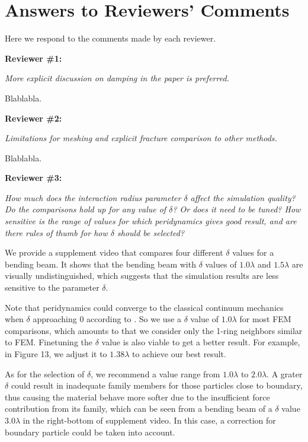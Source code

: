 \section{Answers to Reviewers' Comments}

Here we respond to the comments made by each reviewer.

\noindent{}\textbf{Reviewer \#1:}

\emph{More explicit discussion on damping in the paper is preferred.}

Blablabla.

\noindent{}\textbf{Reviewer \#2:}

\emph{Limitations for meshing and explicit fracture comparison to other methods.}

Blablabla.

\noindent{}\textbf{Reviewer \#3:}

\emph{How much does the interaction radius parameter $\delta$ affect the simulation quality? Do the comparisons hold up for any value of $\delta$? Or does it need to be tuned? How sensitive is the range of values for which peridynamics gives good result, and are there rules of thumb for how $\delta$ should be selected?}

We provide a supplement video that compares four different $\delta$ values for a bending beam. It shows that the bending beam with $\delta$ values of $1.0\lambda$ and $1.5\lambda$ are visually undistinguished, which suggests that the simulation results are less sensitive to the parameter $\delta$.

Note that peridynamics could converge to the classical continuum mechanics when $\delta$ approaching 0 according to \cite{Weckner2005705}. So we use a $\delta$ value of $1.0\lambda$ for most FEM comparisons, which amounts to that we consider only the 1-ring neighbors similar to FEM. Finetuning the $\delta$ value is also viable to get a better result. For example, in Figure 13, we adjust it to $1.38\lambda$ to achieve our best result.

As for the selection of $\delta$, we recommend a value range from $1.0\lambda$ to $2.0\lambda$.
A grater $\delta$ could result in inadequate family members for those particles close to boundary, thus causing the material behave more softer due to the insufficient force contribution from its family, which can be seen from a bending beam of a $\delta$ value $3.0\lambda$ in the right-bottom of supplement video.
In this case, a correction for boundary particle could be taken into account.

